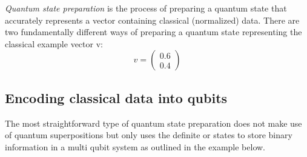 \emph{Quantum state preparation} is the process of preparing a quantum state that accurately represents a vector containing classical (normalized) data. There are two fundamentally different ways of preparing a quantum state representing the classical example vector v:
\begin{equation}
\label{equ:v}
v = \begin{pmatrix}0.6 \\ 0.4 \end{pmatrix}
\end{equation}

\subsection{Encoding classical data into qubits}
\label{subsubsec:classicaldataqubits}
The most straightforward type of quantum state preparation does not make use of quantum superpositions but only uses the definite \0 or \1 states to store binary information in a multi qubit system as outlined in the example below.

